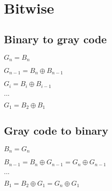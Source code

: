 \section{Bitwise}

\subsection{Binary to gray code}

$G_n = B_n$

$G_{n-1} = B_n \oplus B_{n-1} $

$G_{i} = B_i \oplus B_{i-1} $

$ ... $

$ G_1 = B_2 \oplus B_1 $

\subsection{Gray code to binary}


$ B_n = G_n $

$ B_{n-1} = B_n \oplus G_{n-1} = G_n \oplus G_{n-1} $

$ ... $

$ B_1 = B_2 \oplus G_1 = G_n \oplus G_1 $
